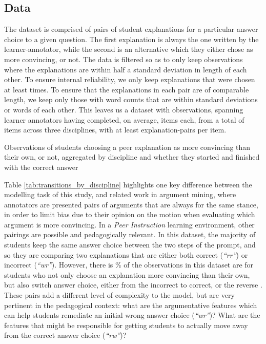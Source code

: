 \documentclass[runningheads]{llncs}
\begin{document}
\subsection{Data}
The dataset is comprised of pairs of student explanations for a particular 
answer choice to a given question. The first explanation is always the one 
written by the learner-annotator, while the second is an alternative which 
they either chose as more convincing, or not. The data is filtered so as 
to only keep observations where the explanations are within half a standard 
deviation in length of each other. To ensure internal reliability, we only keep 
explanations that were chosen at least times. To ensure 
that the explanations in each pair 
are of comparable length, we keep only those with word counts that are within 
standard deviations or 
words of each other. This leaves us a dataset 
with observations, spanning learner 
annotators having completed, on average, items 
each, from a total of items across three disciplines, 
with at least explanation-pairs per item.
\begin{table}
\caption{Observations of students choosing a peer explanation as 
more 
	convincing than their own, or not, aggregated by discipline and whether 
	they 
	started and finished with the correct answer}



\label{tab:transitions_by_discipline}
\end{table}

Table \ref{tab:transitions_by_discipline} highlights one key difference between 
the modelling task of this study, and related work in argument mining, where 
annotators are presented pairs of arguments that are always for the same 
stance, in order to limit bias due to their opinion on the motion when 
evaluating which argument is more convincing.
In a \textit{Peer Instruction} learning environment, other pairings are 
possible and pedagogically relevant. In this dataset, the majority of students 
keep the same answer choice between the two steps of the prompt, and so they 
are comparing two explanations that are either both correct (\textit{``rr''}) 
or incorrect (\textit{``wr''}). However, there is 
\% of the observations in this dataset are for students 
who not only choose an explanation more convincing than their own, but also 
switch answer choice, 
either from the incorrect to correct, or the reverse . These pairs add a 
different level of complexity to the model, but are very pertinent in the 
pedagogical context: what are the argumentative features which can help 
students remediate an initial wrong answer choice (\textit{``wr''})? What are 
the features that might be responsible for getting students to actually move 
away from the correct answer choice (\textit{``rw''})?
\end{document}
